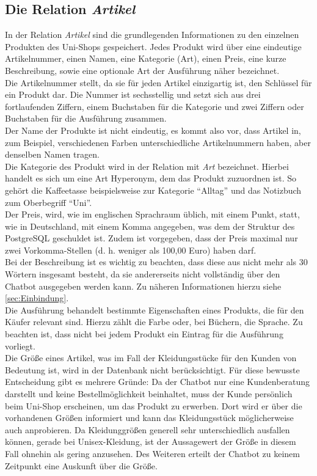 \subsection{Die Relation \textit{Artikel}}
\label{sec:Artikel}

In der Relation \textit{Artikel} sind die grundlegenden Informationen zu den einzelnen Produkten des Uni-Shops gespeichert. Jedes Produkt wird über eine eindeutige Artikelnummer, einen Namen, eine Kategorie (Art), einen Preis, eine kurze Beschreibung, sowie eine optionale Art der Ausführung näher bezeichnet.\\
Die Artikelnummer stellt, da sie für jeden Artikel einzigartig ist, den Schlüssel für ein Produkt dar. Die Nummer ist sechsstellig und setzt sich aus drei fortlaufenden Ziffern, einem Buchstaben für die Kategorie und zwei Ziffern oder Buchstaben für die Ausführung zusammen.\\
Der Name der Produkte ist nicht eindeutig, es kommt also vor, dass Artikel in, zum Beispiel, verschiedenen Farben unterschiedliche Artikelnummern haben, aber denselben Namen tragen.\\
Die Kategorie des Produkt wird in der Relation mit \textit{Art} bezeichnet. Hierbei handelt es sich um eine Art Hyperonym, dem das Produkt zuzuordnen ist. So gehört die Kaffeetasse beispielsweise zur Kategorie "`Alltag"' und das Notizbuch zum Oberbegriff "`Uni"'.\\
Der Preis, wird, wie im englischen Sprachraum üblich, mit einem Punkt, statt, wie in Deutschland, mit einem Komma angegeben, was dem der Struktur des PostgreSQL geschuldet ist. Zudem ist vorgegeben, dass der Preis maximal nur zwei Vorkomma-Stellen (d. h. weniger als 100,00 Euro) haben darf.\\
Bei der Beschreibung ist es wichtig zu beachten, dass diese aus nicht mehr als 30 Wörtern insgesamt besteht, da sie andererseits nicht vollständig über den Chatbot ausgegeben werden kann. Zu näheren Informationen hierzu siehe \ref{sec:Einbindung}.\\
Die Ausführung behandelt bestimmte Eigenschaften eines Produkts, die für den Käufer relevant sind. Hierzu zählt die Farbe oder, bei Büchern, die Sprache. Zu beachten ist, dass nicht bei jedem Produkt ein Eintrag für die Ausführung vorliegt.\\
Die Größe eines Artikel, was im Fall der Kleidungsstücke für den Kunden von Bedeutung ist, wird in der Datenbank nicht berücksichtigt. Für diese bewusste Entscheidung gibt es mehrere Gründe: Da der Chatbot nur eine Kundenberatung darstellt und keine Bestellmöglichkeit beinhaltet, muss der Kunde persönlich beim Uni-Shop erscheinen, um das Produkt zu erwerben. Dort wird er über die vorhandenen Größen informiert und kann das Kleidungsstück möglicherweise auch anprobieren. Da Kleidunggrößen generell sehr unterschiedlich ausfallen können, gerade bei Unisex-Kleidung, ist der Aussagewert der Größe in diesem Fall ohnehin als gering anzusehen. Des Weiteren erteilt der Chatbot zu keinem Zeitpunkt eine Auskunft über die Größe.\\
